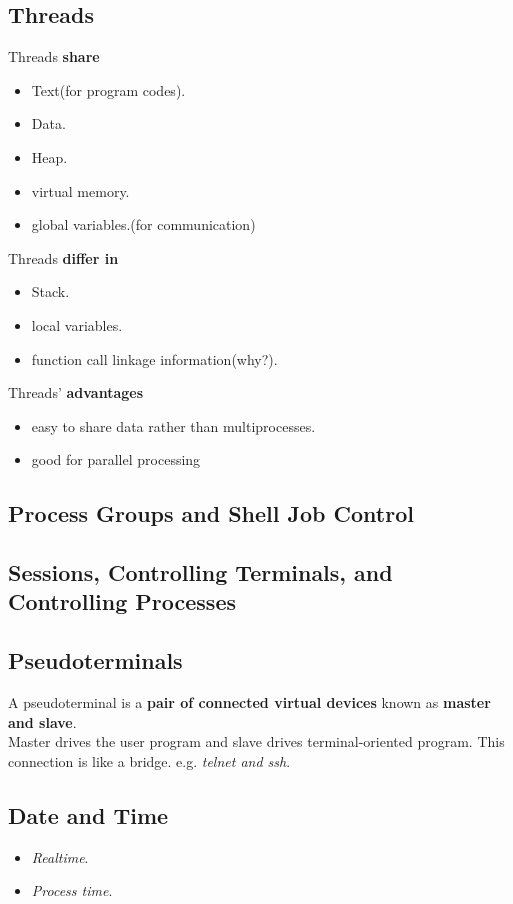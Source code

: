 \documentclass{article}
\begin{document}
\subsection{Threads}
Threads \textbf{share}
\begin{itemize}
\item Text(for program codes).
\item Data.
\item Heap.
\item virtual memory.
\item global variables.(for communication)
\end{itemize}
Threads \textbf{differ in}
\begin{itemize}
\item Stack.
\item local variables.
\item function call linkage information(why?).
\end{itemize}
Threads' \textbf{advantages}
\begin{itemize}
\item easy to share data rather than multiprocesses.
\item good for parallel processing
\end{itemize}

\subsection{Process Groups and Shell Job Control}
\subsection{Sessions, Controlling Terminals, and Controlling Processes}
\subsection{Pseudoterminals}
A pseudoterminal is a \textbf{pair of connected virtual devices} known as \textbf{master and slave}.\\
Master drives the user program and slave drives terminal-oriented program. This connection is like a bridge. e.g. \textit{telnet and ssh}.
\subsection{Date and Time}
\begin{itemize}
\item \textit{Realtime}.
\item \textit{Process time}.
\end{itemize}
\end{document}

